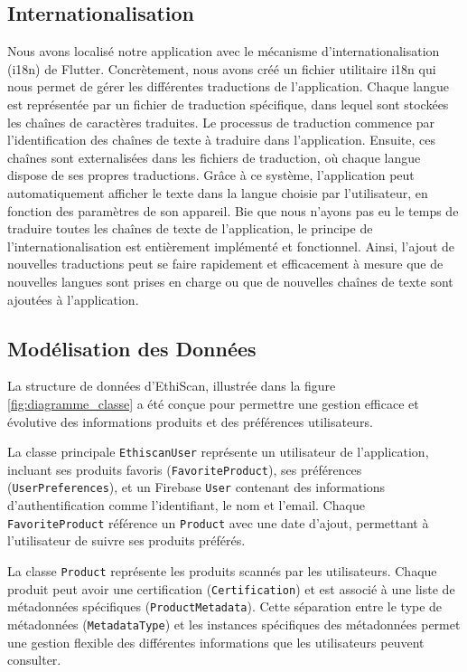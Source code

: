 \subsection{Internationalisation}
\label{sec:i18n}

Nous avons localisé notre application avec le mécanisme d'internationalisation (i18n) de Flutter. Concrètement, nous avons créé un fichier utilitaire i18n qui nous permet de gérer les différentes traductions de l'application. Chaque langue est représentée par un fichier de traduction spécifique, dans lequel sont stockées les chaînes de caractères traduites. Le processus de traduction commence par l'identification des chaînes de texte à traduire dans l'application. Ensuite, ces chaînes sont externalisées dans les fichiers de traduction, où chaque langue dispose de ses propres traductions. Grâce à ce système, l'application peut automatiquement afficher le texte dans la langue choisie par l'utilisateur, en fonction des paramètres de son appareil. Bie que nous n'ayons pas eu le temps de traduire toutes les chaînes de texte de l'application, le principe de l'internationalisation est entièrement implémenté et fonctionnel. Ainsi, l'ajout de nouvelles traductions peut se faire rapidement et efficacement à mesure que de nouvelles langues sont prises en charge ou que de nouvelles chaînes de texte sont ajoutées à l'application.

\subsection{Modélisation des Données}
\label{sec:data_model}

La structure de données d'EthiScan, illustrée dans la figure \ref{fig:diagramme_classe} a été conçue pour permettre une gestion efficace et évolutive des informations produits et des préférences utilisateurs.

La classe principale \texttt{EthiscanUser} représente un utilisateur de l'application, incluant ses produits favoris (\texttt{FavoriteProduct}), ses préférences (\texttt{UserPreferences}), et un Firebase \texttt{User} contenant des informations d'authentification comme l'identifiant, le nom et l'email. Chaque \texttt{FavoriteProduct} référence un \texttt{Product} avec une date d'ajout, permettant à l'utilisateur de suivre ses produits préférés.

La classe \texttt{Product} représente les produits scannés par les utilisateurs. Chaque produit peut avoir une certification (\texttt{Certification}) et est associé à une liste de métadonnées spécifiques (\texttt{ProductMetadata}). Cette séparation entre le type de métadonnées (\texttt{MetadataType}) et les instances spécifiques des métadonnées permet une gestion flexible des différentes informations que les utilisateurs peuvent consulter.

